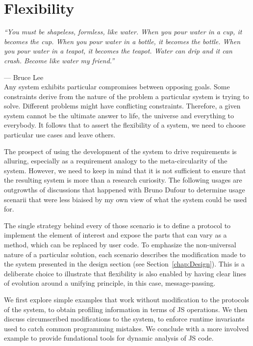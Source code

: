 \chapter{Flexibility}
\label{chap:Flexibility}

\emph{``You must be shapeless, formless, like water. When you pour water in a
cup, it becomes the cup. When you pour water in a bottle, it becomes the
bottle. When you pour water in a teapot, it becomes the teapot. Water can drip
and it can crash. Become like water my friend.''}

--- Bruce Lee \\

Any system exhibits particular compromises between opposing goals. Some
constraints derive from the nature of the problem a particular system is trying
to solve. Different problems might have conflicting constraints. Therefore, a
given system cannot be the ultimate answer to life, the universe and everything
to everybody. It follows that to assert the flexibility of a system, we need to
choose particular use cases and leave others.

The prospect of using the development of the system to drive requirements is
alluring, especially as a requirement analogy to the meta-circularity of the
system. However, we need to keep in mind that it is not sufficient to ensure
that the resulting system is more than a research curiosity. The following
usages are outgrowths of discussions that happened with Bruno Dufour to
determine usage scenarii that were less biaised by my own view of what the
system could be used for.

The single strategy behind every of those scenario is to define a protocol to
implement the element of interest and expose the parts that can vary as a
method, which can be replaced by user code. To emphasize the non-universal
nature of a particular solution, each scenario describes the modification made
to the system presented in the design section (see Section~\ref{chap:Design}).
This is a deliberate choice to illustrate that flexibility is also enabled by
having clear lines of evolution around a unifying principle, in this case,
message-passing.

We first explore simple examples that work without modification to the
protocols of the system, to obtain profiling information in terms of JS operations.
We then discuss circumscribed modifications to the system, to enforce runtime
invariants used to catch common programming mistakes. We conclude with a more
involved example to provide fundational tools for dynamic analysis of JS code.

